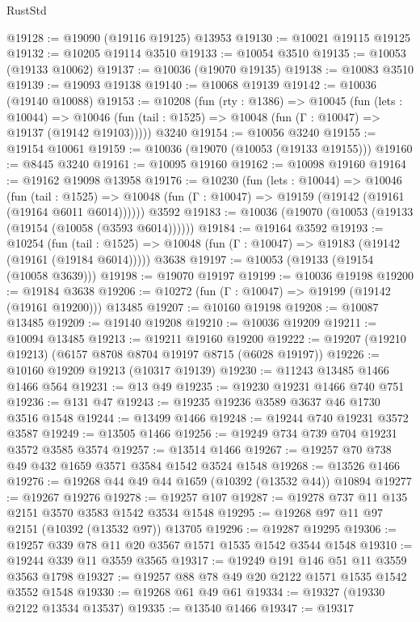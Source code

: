 \begin{lexlean}{RustStd}
\begin{coremodule}
{{@19128 := @19090 (@19116 @19125) @13953
@19130 := @10021 @19115 @19125
@19132 := @10205 @19114 @3510
@19133 := @10054 @3510
@19135 := @10053 (@19133 @10062)
@19137 := @10036 (@19070 @19135)
@19138 := @10083 @3510
@19139 := @19093 @19138
@19140 := @10068 @19139
@19142 := @10036 (@19140 @10088)
@19153 := @10208
    (fun (rty : @1386) =>
    @10045
      (fun (lets : @10044) =>
      @10046 (fun (tail : @1525) => @10048 (fun (Γ : @10047) => @19137 (@19142 @19103)))))
    @3240
@19154 := @10056 @3240
@19155 := @19154 @10061
@19159 := @10036 (@19070 (@10053 (@19133 @19155)))
@19160 := @8445 @3240
@19161 := @10095 @19160
@19162 := @10098 @19160
@19164 := @19162 @19098 @13958
@19176 := @10230
    (fun (lets : @10044) =>
    @10046
      (fun (tail : @1525) =>
      @10048 (fun (Γ : @10047) => @19159 (@19142 (@19161 (@19164 @6011 @6014))))))
    @3592
@19183 := @10036 (@19070 (@10053 (@19133 (@19154 (@10058 (@3593 @6014))))))
@19184 := @19164 @3592
@19193 := @10254
    (fun (tail : @1525) => @10048 (fun (Γ : @10047) => @19183 (@19142 (@19161 (@19184 @6014)))))
    @3638
@19197 := @10053 (@19133 (@19154 (@10058 @3639)))
@19198 := @19070 @19197
@19199 := @10036 @19198
@19200 := @19184 @3638
@19206 := @10272 (fun (Γ : @10047) => @19199 (@19142 (@19161 @19200))) @13485
@19207 := @10160 @19198
@19208 := @10087 @13485
@19209 := @19140 @19208
@19210 := @10036 @19209
@19211 := @10094 @13485
@19213 := @19211 @19160 @19200
@19222 := @19207 (@19210 @19213) (@6157 @8708 @8704 @19197 @8715 (@6028 @19197))
@19226 := @10160 @19209 @19213 (@10317 @19139)
@19230 := @11243 @13485 @1466 @1466 @564
@19231 := @13 @49
@19235 := @19230 @19231 @1466 @740 @751
@19236 := @131 @47
@19243 := @19235 @19236 @3589 @3637 @46 @1730 @3516 @1548
@19244 := @13499 @1466
@19248 := @19244 @740 @19231 @3572 @3587
@19249 := @13505 @1466
@19256 := @19249 @734 @739 @704 @19231 @3572 @3585 @3574
@19257 := @13514 @1466
@19267 := @19257 @70 @738 @49 @432 @1659 @3571 @3584 @1542 @3524 @1548
@19268 := @13526 @1466
@19276 := @19268 @44 @49 @44 @1659 (@10392 (@13532 @44)) @10894
@19277 := @19267 @19276
@19278 := @19257 @107
@19287 := @19278 @737 @11 @135 @2151 @3570 @3583 @1542 @3534 @1548
@19295 := @19268 @97 @11 @97 @2151 (@10392 (@13532 @97)) @13705
@19296 := @19287 @19295
@19306 := @19257 @339 @78 @11 @20 @3567 @1571 @1535 @1542 @3544 @1548
@19310 := @19244 @339 @11 @3559 @3565
@19317 := @19249 @191 @146 @51 @11 @3559 @3563 @1798
@19327 := @19257 @88 @78 @49 @20 @2122 @1571 @1535 @1542 @3552 @1548
@19330 := @19268 @61 @49 @61
@19334 := @19327 (@19330 @2122 @13534 @13537)
@19335 := @13540 @1466
@19347 := @19317
}}
\end{coremodule}
\end{lexlean}
